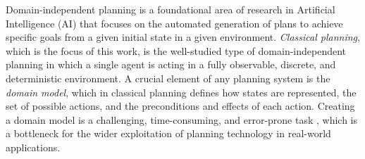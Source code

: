 \documentclass[letterpaper]{article} %
\newif\ifaddcomments
\newcommand{\roni}[1]{\ifaddcomments{\textcolor{red}{[Roni: #1]}}\fi}
\newcommand{\pascalJr}[1]{\ifaddcomments{\textcolor{cyan}{[Pascal L.: {#1}]}}\fi}
\begin{document}
Domain-independent planning is a foundational area of research in Artificial Intelligence (AI) that focuses on the automated generation of plans to achieve specific goals from a given initial state in a given environment. 
\emph{Classical planning}, which is the focus of this work, is the well-studied type of domain-independent planning in which a single agent is acting in a fully observable, discrete, and deterministic environment. 
A crucial element of any planning system is the \emph{domain model}, which in classical planning defines how states are represented, the set of possible actions, and the preconditions and effects of each action. 
Creating a domain model is a challenging, time-consuming, and error-prone task \citep{DBLP:conf/kcap/McCluskeyVV17}, which is a bottleneck for the wider exploitation of planning technology in real-world applications. 
\end{document}
